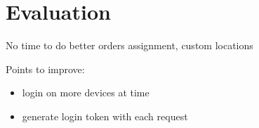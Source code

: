 \chapter{Evaluation}

No time to do better orders assignment, custom locations

Points to improve:
\begin{itemize}
	\item login on more devices at time
	\item generate login token with each request 
\end{itemize}